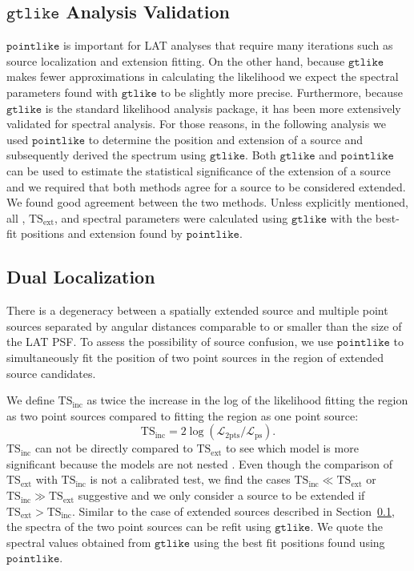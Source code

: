 \documentclass[12pt,preprint]{aastex}
\newcommand{\tsext}{{\ensuremath{\text{TS}_{\text{ext}}}}\xspace}
\newcommand{\tsinc}{\ensuremath{\text{TS}_{\text{inc}}}\xspace}
\newcommand{\likelihood}{\ensuremath{\mathcal{L}}\xspace}
\newcommand{\ts}{\text{TS}\xspace}
\newcommand{\gtlike}{\ensuremath{\mathtt{gtlike}}\xspace}
\newcommand{\pointlike}{\ensuremath{\mathtt{pointlike}}\xspace}
\begin{document}
\subsection{\gtlike Analysis Validation}
\label{gtlike_crosscheck}

\pointlike is important for LAT analyses that require many iterations
such as source localization and extension fitting.  On the other hand,
because \gtlike makes fewer approximations in calculating the likelihood
we expect the spectral parameters found with \gtlike to be slightly more
precise.  Furthermore, because \gtlike is the standard likelihood analysis
package, it has been more extensively validated for spectral analysis.
For those reasons, in the following analysis we used \pointlike to
determine the position and extension of a source and subsequently derived
the spectrum using \gtlike. Both \gtlike and \pointlike can be used to
estimate the statistical significance of the extension of a source and we
required that both methods agree for a source to be considered extended.
We found good agreement between the two methods.  Unless explicitly
mentioned, all \ts, \tsext, and spectral parameters were calculated using
\gtlike with the best-fit positions and extension found by \pointlike.

\subsection{Dual Localization}
\label{dual_localization_method}

There is a degeneracy between a spatially extended source and multiple
point sources separated by angular distances comparable to or smaller than
the size of the LAT PSF.  To assess the possibility of source confusion,
we use \pointlike to simultaneously fit the position of two point sources
in the region of extended source candidates.

We define \tsinc as twice the increase in the log of the likelihood fitting the
region as two point sources compared to fitting the region as one point
source: 
\begin{equation}
  \tsinc=2\log(\likelihood_\text{2pts}/\likelihood_\text{ps}).
\end{equation} 
\tsinc can not be directly compared to \tsext to see which
model is more significant because the models are not nested
\citep{statistics_with_care}. Even though the comparison of \tsext with
\tsinc is not a calibrated test, we find the cases $\tsinc \ll \tsext$
or $\tsinc\gg\tsext$ suggestive and we only consider a source to be
extended if $\tsext>\tsinc$.
Similar to the case of extended sources described in Section~\ref{gtlike_crosscheck},
the spectra of the two point sources can be refit using \gtlike.
We quote the spectral values obtained from \gtlike using the best fit
positions found using \pointlike.  
\end{document}
